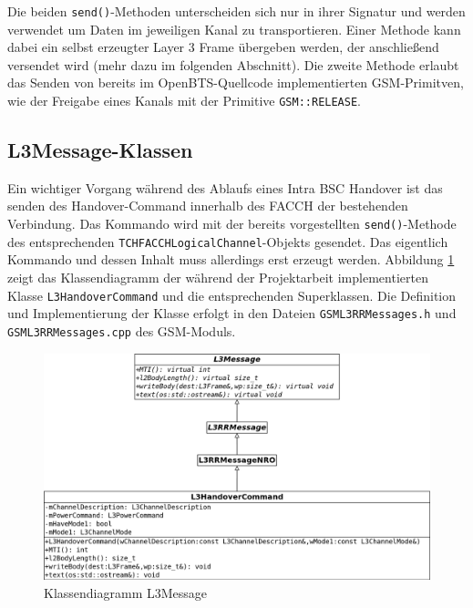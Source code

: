 Die beiden \lstinline{send()}-Methoden unterscheiden sich nur in ihrer Signatur und werden verwendet um Daten im jeweiligen Kanal zu transportieren. Einer Methode kann dabei ein selbst erzeugter Layer 3 Frame übergeben werden, der anschließend versendet wird (mehr dazu im folgenden Abschnitt). Die zweite Methode erlaubt das Senden von bereits im OpenBTS-Quellcode implementierten GSM-Primitven, wie der Freigabe eines Kanals mit der Primitive \lstinline{GSM::RELEASE}.

\subsection{L3Message-Klassen}

Ein wichtiger Vorgang während des Ablaufs eines Intra BSC Handover ist das senden des Handover-Command innerhalb des FACCH der bestehenden Verbindung. Das Kommando wird mit der bereits vorgestellten \lstinline{send()}-Methode des entsprechenden \lstinline{TCHFACCHLogicalChannel}-Objekts gesendet. Das eigentlich Kommando und dessen Inhalt muss allerdings erst erzeugt werden. Abbildung \ref{fig:l3mess} zeigt das Klassendiagramm der während der Projektarbeit implementierten Klasse \lstinline{L3HandoverCommand} und die entsprechenden Superklassen. Die Definition und Implementierung der Klasse erfolgt in den Dateien \lstinline{GSML3RRMessages.h} und \lstinline{GSML3RRMessages.cpp} des GSM-Moduls.

\begin{figure}[h!]
  \centering
  \includegraphics[width=\textwidth]{img/l3m}
  \caption{Klassendiagramm L3Message}
  \label{fig:l3mess}
\end{figure}

